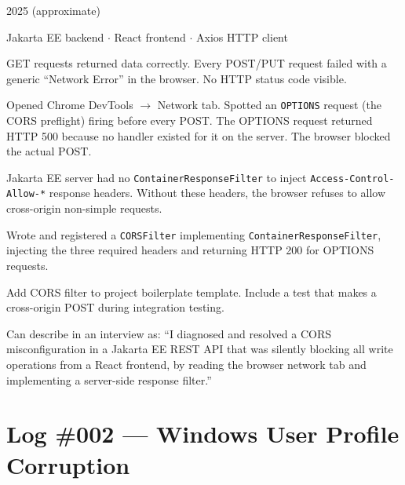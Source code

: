 \documentclass[11pt, letterpaper]{article}
\begin{document}
\begin{tcolorbox}[colback=logbg, colframe=logborder, arc=3pt, boxrule=1pt]
\begin{description}[noitemsep, leftmargin=2cm, style=nextline]
  \item[\textbf{Date}] 2025 (approximate)
  \item[\textbf{Stack}] Jakarta EE backend $\cdot$ React frontend $\cdot$ Axios HTTP client
  \item[\textbf{Symptom}] GET requests returned data correctly. Every POST/PUT request failed with a generic ``Network Error'' in the browser. No HTTP status code visible.
  \item[\textbf{Diagnosis}] Opened Chrome DevTools $\to$ Network tab. Spotted an \texttt{OPTIONS} request (the CORS preflight) firing before every POST. The OPTIONS request returned HTTP 500 because no handler existed for it on the server. The browser blocked the actual POST.
  \item[\textbf{Root Cause}] Jakarta EE server had no \texttt{ContainerResponseFilter} to inject \texttt{Access-Control-Allow-*} response headers. Without these headers, the browser refuses to allow cross-origin non-simple requests.
  \item[\textbf{Fix}] Wrote and registered a \texttt{CORSFilter} implementing \texttt{ContainerResponseFilter}, injecting the three required headers and returning HTTP 200 for OPTIONS requests.
  \item[\textbf{Prevention}] Add CORS filter to project boilerplate template. Include a test that makes a cross-origin POST during integration testing.
  \item[\textbf{STAR summary}] Can describe in an interview as: ``I diagnosed and resolved a CORS misconfiguration in a Jakarta EE REST API that was silently blocking all write operations from a React frontend, by reading the browser network tab and implementing a server-side response filter.''
\end{description}
\end{tcolorbox}

\section*{Log \#002 --- Windows User Profile Corruption}
\end{document}

